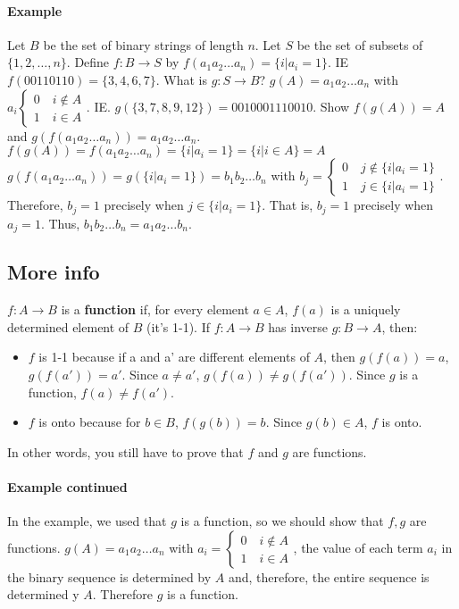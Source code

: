 \documentclass[10pt,letter]{article}
\begin{document}
\paragraph{Example} Let $B$ be the set of binary strings of length $n$. Let $S$ be the set of subsets of $\{1,2,\ldots,n\}$. Define $f:B\rightarrow S$ by $f(a_1a_2\ldots a_n)=\{i|a_i=1\}$. IE $f(00110110)=\{3,4,6,7\}$. What is $g:S\rightarrow B$? $g(A)=a_1a_2\ldots a_n$ with $a_i\begin{cases}0\quad i\notin A\\1\quad i\in A\end{cases}$. IE. $g(\{3,7,8,9,12\})=0010001110010$. Show $f(g(A))=A$ and $g(f(a_1a_2\ldots a_n))=a_1a_2\ldots a_n$.\\ $f(g(A))=f(a_1a_2\ldots a_n)=\{i|a_i=1\} = \{i|i\in A\} = A$\\ $g(f(a_1a_2\ldots a_n))=g(\{i|a_i=1\})=b_1b_2\ldots b_n$ with $b_j=\begin{cases}0\quad j\notin\{i|a_i=1\}\\ 1\quad j\in\{i|a_i=1\}\end{cases}$. Therefore, $b_j=1$ precisely when $j\in\{i|a_i=1\}$. That is, $b_j=1$ precisely when $a_j=1$. Thus, $b_1b_2\ldots b_n=a_1a_2\ldots b_n$. 
\subsection*{More info} $f:A\rightarrow B$ is a \textbf{function} if, for every element $a\in A$, $f(a)$ is a uniquely determined element of $B$ (it's 1-1). If $f:A\rightarrow B$ has inverse $g:B\rightarrow A$, then: 
\begin{itemize}
    \item $f$ is 1-1 because if a and a' are different elements of $A$, then $g(f(a))=a$, $g(f(a'))=a'$. Since $a\neq a'$, $g(f(a))\neq g(f(a'))$. Since $g$ is a function, $f(a)\neq f(a')$.
    \item $f$ is onto because for $b\in B$, $f(g(b))=b$. Since $g(b)\in A$, $f$ is onto. 
\end{itemize} 
In other words, you still have to prove that $f$ and $g$ are functions. 
\paragraph{Example continued} In the example, we used that $g$ is a function, so we should show that $f,g$ are functions. $g(A)=a_1a_2\ldots a_n$ with $a_i=\begin{cases}0\quad i\notin A\\1\quad i\in A\end{cases}$, the value of each term $a_i$ in the binary sequence is determined by $A$ and, therefore, the entire sequence is determined y $A$. Therefore $g$ is a function. 
\end{document}
